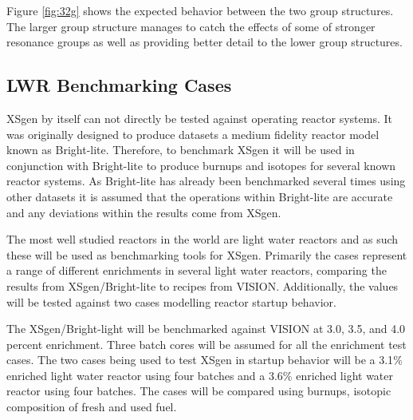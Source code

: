 \documentclass{article}
\begin{document}
Figure \ref{fig:32g} shows the expected behavior between the two group structures. The larger group structure manages to catch the effects of some of stronger resonance groups as well as providing better detail to the lower group structures. 

\subsection{LWR Benchmarking Cases}
XSgen by itself can not directly be tested against operating reactor systems. It was originally designed to produce datasets a medium fidelity reactor model known as Bright-lite. Therefore, to benchmark XSgen it will be used in conjunction with Bright-lite to produce burnups and isotopes for several known reactor systems.  As Bright-lite has already been benchmarked several times using other datasets\cite{brightlite} it is assumed that the operations within Bright-lite are accurate and any deviations within the results come from XSgen.

The most well studied reactors in the world are light water reactors and as such these will be used as benchmarking tools for XSgen. Primarily the cases represent a range of different enrichments in several light water reactors, comparing the results from XSgen/Bright-lite to recipes from VISION\cite{vision}. Additionally, the values will be tested against two cases modelling reactor startup behavior. 

The XSgen/Bright-light will be benchmarked against VISION at 3.0, 3.5, and 4.0 percent enrichment. Three batch cores will be assumed for all the enrichment test cases.
The two cases being used to test XSgen in startup behavior will be a 3.1$\%$ enriched light water reactor using four batches and a 3.6$\%$ enriched light water reactor using four batches. The cases will be compared using burnups, isotopic composition of fresh and used fuel.
\end{document}

